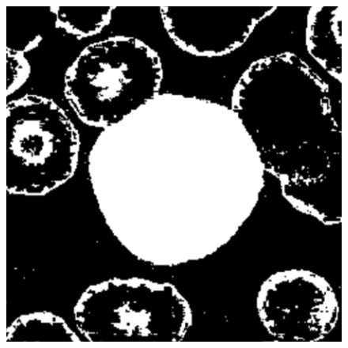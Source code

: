 \documentclass[final,a4paper,12pt,english]{UnicaPhdThesis3}
\begin{document}
\begin{figure}[!b]
	\includegraphics[height=0.10\textheight]{images/2015_1_caip/1-3}\vspace{0.5mm}


\end{figure}
\end{document}
